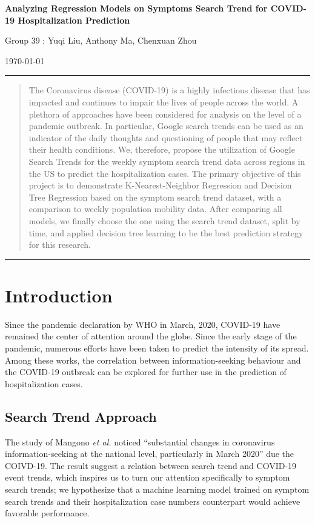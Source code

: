\documentclass[12pt]{article}
\begin{document}
 

	\begin{center}
		\Large
		\textbf{Analyzing Regression Models on Symptoms Search Trend for COVID-19 Hospitalization Prediction }
		\vspace{0.5cm}
		
		\large
		Group 39 : Yuqi Liu, Anthony Ma, Chenxuan Zhou
		
		\today
	\end{center}
	
    \hrule
	\begin{abstract} 
    The Coronavirus disease (COVID-19) is a highly infectious disease that has impacted and continues to impair the lives of people across the world. A plethora of approaches have been considered for analysis on the level of a pandemic outbreak. In particular, Google search trends can be used as an indicator of the daily thoughts and questioning of people that may reflect their health conditions. We, therefore, propose the utilization of Google Search Trends for the weekly symptom search trend data across regions in the US to predict the hospitalization cases. The primary objective of this project is to demonstrate K-Nearest-Neighbor Regression and Decision Tree Regression based on the symptom search trend dataset, with a comparison to weekly population mobility data. After comparing all models, we finally choose the one using the search trend dataset, split by time, and applied decision tree learning to be the best prediction strategy for this research.
	
	\end{abstract}
    \hrule

\section{Introduction}\label{sec:introduction}

Since the pandemic declaration by WHO in March, 2020, COVID-19 have remained the center of attention around the globe. Since the early stage of the pandemic, numerous efforts have been taken to predict the intensity of its spread. Among these works, the correlation between information-seeking behaviour \cite{mangono2020pace} and the COVID-19 outbreak can be explored for further use in the prediction of hospitalization cases.

\subsection{Search Trend Approach}
The study of Mangono \textit{et al.} noticed “substantial changes in coronavirus information-seeking at the national level, particularly in March 2020” due the COIVD-19\cite{mangono2020pace}. The result suggest a relation between search trend and COVID-19 event trends, which inspires us to turn our attention specifically to symptom search trends; we hypothesize that a machine learning model trained on symptom search trends and their hospitalization case numbers counterpart would achieve favorable performance.
\end{document}
